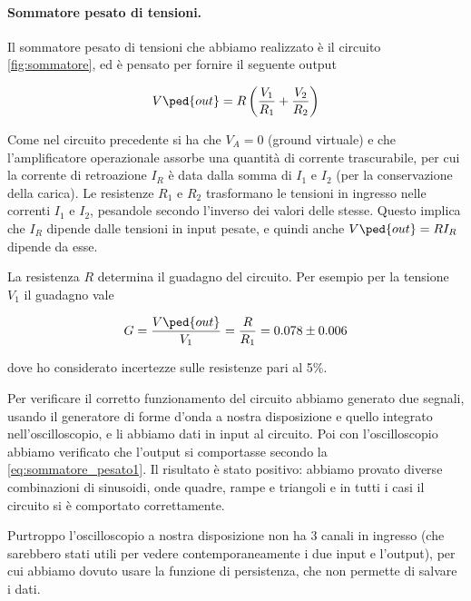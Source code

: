 \paragraph{Sommatore pesato di tensioni.}

Il sommatore pesato di tensioni che abbiamo realizzato è il circuito \ref{fig:sommatore},
ed è pensato per fornire il seguente output

\begin{equation}
    V\ped{out} = R\left(\frac{V_1}{R_1} + \frac{V_2}{R_2}\right)
    \label{eq:sommatore_pesato1}
\end{equation}

Come nel circuito precedente si ha che $V_A = 0$ (ground virtuale) e che
l'amplificatore operazionale assorbe una quantità di corrente trascurabile,
per cui la corrente di retroazione $I_R$ è data dalla somma di $I_1$ e $I_2$
(per la conservazione della carica).
Le resistenze $R_1$ e $R_2$ trasformano le tensioni in ingresso nelle correnti
$I_1$ e $I_2$, pesandole secondo l'inverso dei valori delle stesse.
Questo implica che $I_R$ dipende dalle tensioni in input pesate,
e quindi anche $V\ped{out} = RI_R$ dipende da esse.

La resistenza $R$ determina il guadagno del circuito. Per esempio per la tensione
$V_1$ il guadagno vale

\begin{equation}
    G = \frac{V\ped{out}}{V_1} = \frac{R}{R_1} = 0.078 \pm 0.006
\end{equation}

dove ho considerato incertezze sulle resistenze pari al 5\%.

Per verificare il corretto funzionamento del circuito abbiamo generato due segnali,
usando il generatore di forme d'onda a nostra disposizione e quello integrato
nell'oscilloscopio, e li abbiamo dati in input al circuito. Poi con l'oscilloscopio
abbiamo verificato che l'output si comportasse secondo la \eqref{eq:sommatore_pesato1}.
Il risultato è stato positivo: abbiamo provato diverse combinazioni di sinusoidi,
onde quadre, rampe e triangoli e in tutti i casi il circuito si è comportato correttamente.

Purtroppo l'oscilloscopio a nostra disposizione non ha 3 canali in ingresso (che sarebbero
stati utili per vedere contemporaneamente i due input e l'output), per cui abbiamo dovuto
usare la funzione di persistenza, che non permette di salvare i dati.
